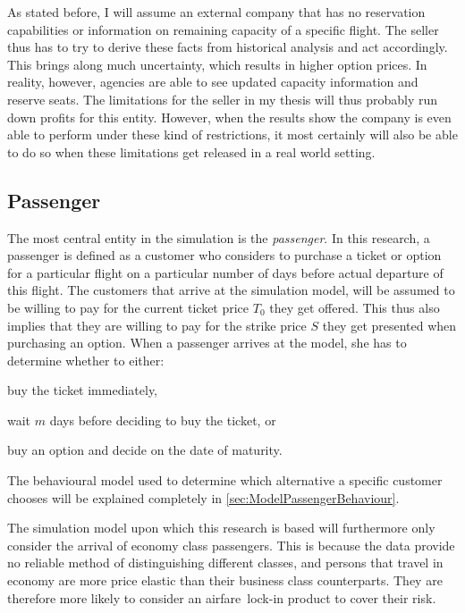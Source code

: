 As stated before, I will assume an external company that has no reservation capabilities or information on remaining capacity of a specific flight. The seller thus has to try to derive these facts from historical analysis and act accordingly. This brings along much uncertainty, which results in higher option prices. In reality, however, agencies are able to see updated capacity information and reserve seats. The limitations for the seller in my thesis will thus probably run down profits for this entity. However, when the results show the company is even able to perform under these kind of restrictions, it most certainly will also be able to do so when these limitations get released in a real world setting.


\subsection{Passenger}
\label{sec:Passenger}
The most central entity in the simulation is the \emph{passenger}. In this research, a passenger is defined as a customer who considers to purchase a ticket or option for a particular flight on a particular number of days before actual departure of this flight. The customers that arrive at the simulation model, will be assumed to be willing to pay for the current ticket price $T_0$ they get offered. This thus also implies that they are willing to pay for the strike price $S$ they get presented when purchasing an option. When a passenger arrives at the model, she has to determine whether to either:

\begin{compactitem}
    \item buy the ticket immediately,
    \item wait $m$ days before deciding to buy the ticket, or
    \item buy an option and decide on the date of maturity.
\end{compactitem}
\vspace{1em}

The behavioural model used to determine which alternative a specific customer chooses will be explained completely in \autoref{sec:ModelPassengerBehaviour}.


The simulation model upon which this research is based will furthermore only consider the arrival of economy class passengers. This is because the data provide no reliable method of distinguishing different classes, and persons that travel in economy are more price elastic than their business class counterparts. They are therefore more likely to consider an airfare~lock-in product to cover their risk.


